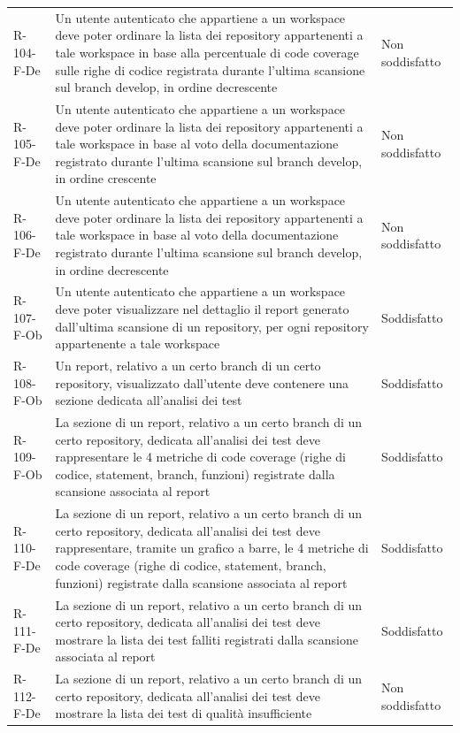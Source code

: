 \documentclass[a4paper, 11pt]{article}
\begin{document}
\begin{longtable}[c]{ >{\centering\arraybackslash}m{2.5cm} >{\centering\arraybackslash}m{8.3cm} >{\centering\arraybackslash}m{3.5cm} }
R-104-F-De & Un utente autenticato che appartiene a un workspace deve poter ordinare la lista dei repository appartenenti a tale workspace in base alla percentuale di code coverage sulle righe di codice registrata durante l'ultima scansione sul branch develop, in ordine decrescente & Non soddisfatto\\
R-105-F-De & Un utente autenticato che appartiene a un workspace deve poter ordinare la lista dei repository appartenenti a tale workspace in base al voto della documentazione registrato durante l'ultima scansione sul branch develop, in ordine crescente & Non soddisfatto\\
R-106-F-De & Un utente autenticato che appartiene a un workspace deve poter ordinare la lista dei repository appartenenti a tale workspace in base al voto della documentazione registrato durante l'ultima scansione sul branch develop, in ordine decrescente & Non soddisfatto\\
R-107-F-Ob & Un utente autenticato che appartiene a un workspace deve poter visualizzare nel dettaglio il report generato dall'ultima scansione di un repository, per ogni repository appartenente a tale workspace & Soddisfatto\\
R-108-F-Ob & Un report, relativo a un certo branch di un certo repository, visualizzato dall'utente deve contenere una sezione dedicata all'analisi dei test & Soddisfatto\\
R-109-F-Ob & La sezione di un report, relativo a un certo branch di un certo repository, dedicata all'analisi dei test deve rappresentare le 4 metriche di code coverage (righe di codice, statement, branch, funzioni) registrate dalla scansione associata al report & Soddisfatto\\
R-110-F-De & La sezione di un report, relativo a un certo branch di un certo repository, dedicata all'analisi dei test deve rappresentare, tramite un grafico a barre, le 4 metriche di code coverage (righe di codice, statement, branch, funzioni) registrate dalla scansione associata al report & Soddisfatto\\
R-111-F-De & La sezione di un report, relativo a un certo branch di un certo repository, dedicata all'analisi dei test deve mostrare la lista dei test falliti registrati dalla scansione associata al report & Soddisfatto\\
R-112-F-De & La sezione di un report, relativo a un certo branch di un certo repository, dedicata all'analisi dei test deve mostrare la lista dei test di qualità insufficiente & Non soddisfatto\\

\end{longtable}
\end{document}
